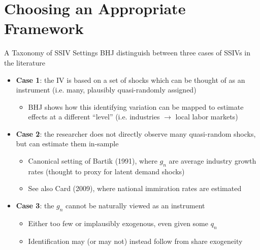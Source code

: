 \documentclass{beamer}
\begin{document}
\section{Choosing an Appropriate Framework}

\begin{frame}{A Taxonomy of SSIV Settings}
\vspace{-0.3cm}
BHJ distinguish between three cases of SSIVs in the literature\medskip\pause{}

\begin{itemize}
\item \textbf{Case 1}: the IV is based on a set of shocks which can be thought of as an instrument (i.e. many, plausibly quasi-randomly assigned)\smallskip
\begin{itemize}
\item BHJ shows how this identifying variation can be mapped to estimate effects at a different ``level'' (i.e. industries $\rightarrow$ local labor markets)
\end{itemize}\medskip\pause{}
\item \textbf{Case 2}: the researcher does not directly observe many quasi-random shocks, but can estimate them in-sample\smallskip
\begin{itemize}
\item Canonical setting of Bartik (1991), where $g_n$ are average industry growth rates (thought to proxy for latent demand shocks)\smallskip
\item See also Card (2009), where national immiration rates are estimated
\end{itemize}\medskip\pause{}
\item \textbf{Case 3}: the $g_n$ cannot be naturally viewed as an instrument\smallskip
\begin{itemize}
\item Either too few or implausibly exogenous, even given some $q_n$\smallskip
\item Identification may (or may not) instead follow from share exogeneity
\end{itemize}
\end{itemize}

\end{frame}
\end{document}
